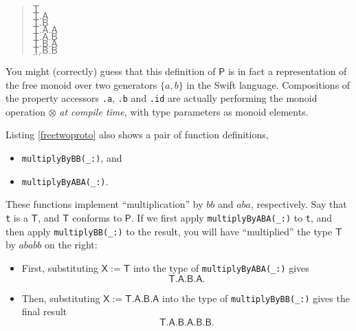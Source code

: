\documentclass[a4paper,headsepline,bibliography=totoc,toc=flat,fleqn,twoside=semi]{scrbook}
\theoremstyle{definition}
\theoremstyle{definition}
\theoremstyle{definition}
\newcommand{\namesym}[1]{\mathsf{#1}}
\newcommand{\genericparam}[1]{\bm{\mathsf{#1}}}
\begin{document}
\begin{quote}
\noindent$\genericparam{T}$\\
$\genericparam{T}.\namesym{A}$\\
$\genericparam{T}.\namesym{B}$\\
$\genericparam{T}.\namesym{A}.\namesym{A}$\\
$\genericparam{T}.\namesym{A}.\namesym{B}$\\
$\genericparam{T}.\namesym{B}.\namesym{A}$\\
$\genericparam{T}.\namesym{B}.\namesym{B}$\\
$\ldots$
\end{quote}

You might (correctly) guess that this definition of $\bm{\mathsf{P}}$ is in fact a representation of the free monoid over two generators $\{a, b\}$ in the Swift language. Compositions of the property accessors \texttt{.a}, \texttt{.b} and \texttt{.id} are actually performing the monoid operation $\otimes$ \emph{at compile time}, with type parameters as monoid elements.

Listing \ref{freetwoproto} also shows a pair of function definitions, 
\begin{itemize}
\item \texttt{multiplyByBB(\_:)}, and
\item \texttt{multiplyByABA(\_:)}.
\end{itemize}
These functions implement ``multiplication'' by $bb$ and $aba$, respectively. Say that \texttt{t} is a $\genericparam{T}$, and $\genericparam{T}$ conforms to $\bm{\mathsf{P}}$. If we first apply \texttt{multiplyByABA(\_:)} to \texttt{t}, and then apply \texttt{multiplyBB(\_:)} to the result, you will have ``multiplied'' the type $\genericparam{T}$ by $ababb$ on the right:
\begin{itemize}
\item First, substituting $\genericparam{X}:=\genericparam{T}$ into the type of \texttt{multiplyByABA(\_:)} gives
\[\genericparam{T}.\namesym{A}.\namesym{B}.\namesym{A}.\]
\item Then, substituting $\genericparam{X} := \genericparam{T}.\namesym{A}.\namesym{B}.\namesym{A}$ into the type of \texttt{multiplyByBB(\_:)} gives the final result
\[\genericparam{T}.\namesym{A}.\namesym{B}.\namesym{A}.\namesym{B}.\namesym{B}.\]
\end{itemize}
\end{document}
